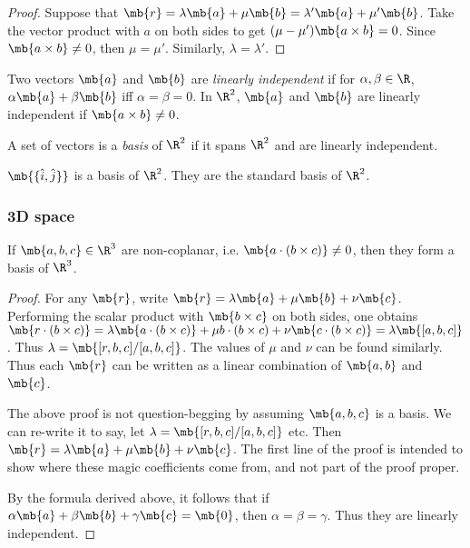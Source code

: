 \documentclass[a4paper]{article}
\begin{document}
\begin{proof}
  Suppose that $\mb{r} = \lambda\mb{a} + \mu\mb{b} = \lambda'\mb{a} + \mu'\mb{b}$. Take the vector product with $a$ on both sides to get $(\mu - \mu')\mb{a\times b} = 0$. Since $\mb{a\times b}\not= 0$, then $\mu=\mu'$. Similarly, $\lambda = \lambda'$.
\end{proof}

\begin{defi}
  Two vectors $\mb{a}$ and $\mb{b}$ are \emph{linearly independent} if  for $\alpha, \beta\in \R$, $\alpha\mb{a} + \beta\mb{b}$ iff $\alpha = \beta = 0$. In $\R^2$, $\mb{a}$ and $\mb{b}$ are linearly independent if $\mb{a\times b} \not= 0$.
\end{defi}

\begin{defi}[Basis of $\R^2$]
  A set of vectors is a \emph{basis} of $\R^2$ if it spans $\R^2$ and are linearly independent.
\end{defi}

\begin{eg}
  $\mb{\{\hat{i}, \hat{j}\}}$ is a basis of $\R^2$. They are the standard basis of $\R^2$.
\end{eg}

\subsubsection{3D space}
\begin{thm}
  If $\mb{a, b, c}\in\R^3$ are non-coplanar, i.e. $\mb{a\cdot(b\times c)}\not= 0$, then they form a basis of $\R^3$.
\end{thm}

\begin{proof}
  For any $\mb{r}$, write $\mb{r} = \lambda\mb{a} + \mu\mb{b} + \nu\mb{c}$. Performing the scalar product with $\mb{b\times c}$ on both sides, one obtains $\mb{r\cdot(b\times c)} = \lambda \mb{a\cdot(b\times c)} + \mu{b\cdot (b\times c)} + \nu\mb{c\cdot(b\times c)} = \lambda \mb{[a, b, c]}$. Thus $\lambda = \mb{[r, b, c]/[a,b, c]}$. The values of $\mu$ and $\nu$ can be found similarly. Thus each $\mb{r}$ can be written as a linear combination of $\mb{a, b}$ and $\mb{c}$.

\note The above proof is not question-begging by assuming $\mb{a, b, c}$ is a basis. We can re-write it to say, let $\lambda = \mb{[r, b, c]/[a,b, c]}$ etc. Then $\mb{r} = \lambda\mb{a} + \mu\mb{b} + \nu\mb{c}$. The first line of the proof is intended to show where these magic coefficients come from, and not part of the proof proper.

By the formula derived above, it follows that if $\alpha\mb{a} + \beta\mb{b} + \gamma\mb{c} = \mb{0}$, then $\alpha = \beta = \gamma$. Thus they are linearly independent.
\end{proof}
\end{document}
